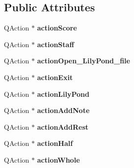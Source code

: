 \subsection*{Public Attributes}
\begin{DoxyCompactItemize}
\item 
\hypertarget{class_ui___main_window_a65929e7b9005cd18d374457316727024}{}Q\+Action $\ast$ {\bfseries action\+Score}\label{class_ui___main_window_a65929e7b9005cd18d374457316727024}

\item 
\hypertarget{class_ui___main_window_ab115a121a4909c8aad3cb01ef1812893}{}Q\+Action $\ast$ {\bfseries action\+Staff}\label{class_ui___main_window_ab115a121a4909c8aad3cb01ef1812893}

\item 
\hypertarget{class_ui___main_window_ad950d2ab76bfbe081e22158a785183b6}{}Q\+Action $\ast$ {\bfseries action\+Open\+\_\+\+Lily\+Pond\+\_\+file}\label{class_ui___main_window_ad950d2ab76bfbe081e22158a785183b6}

\item 
\hypertarget{class_ui___main_window_ae8370529640da51b50cd1fb5be677c02}{}Q\+Action $\ast$ {\bfseries action\+Exit}\label{class_ui___main_window_ae8370529640da51b50cd1fb5be677c02}

\item 
\hypertarget{class_ui___main_window_af762715085b683b0b0c78bb3eae44dd3}{}Q\+Action $\ast$ {\bfseries action\+Lily\+Pond}\label{class_ui___main_window_af762715085b683b0b0c78bb3eae44dd3}

\item 
\hypertarget{class_ui___main_window_a9bb2269ab28058dcb12734b1dacb5292}{}Q\+Action $\ast$ {\bfseries action\+Add\+Note}\label{class_ui___main_window_a9bb2269ab28058dcb12734b1dacb5292}

\item 
\hypertarget{class_ui___main_window_a5e6366b1fbc8f89cdff86006f92a0c15}{}Q\+Action $\ast$ {\bfseries action\+Add\+Rest}\label{class_ui___main_window_a5e6366b1fbc8f89cdff86006f92a0c15}

\item 
\hypertarget{class_ui___main_window_a7692563f413df714dfb4e8ed8010c0e9}{}Q\+Action $\ast$ {\bfseries action\+Half}\label{class_ui___main_window_a7692563f413df714dfb4e8ed8010c0e9}

\item 
\hypertarget{class_ui___main_window_ae98fd6bf7df7b27ec592b96789eeb0cd}{}Q\+Action $\ast$ {\bfseries action\+Whole}\label{class_ui___main_window_ae98fd6bf7df7b27ec592b96789eeb0cd}


\end{DoxyCompactItemize}

